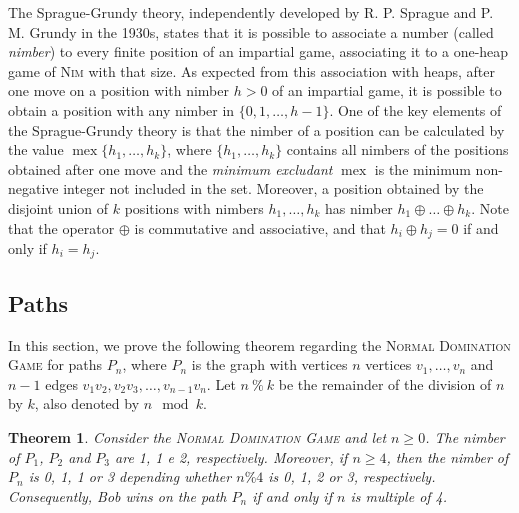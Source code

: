 \documentclass[12pt]{article}
\newtheorem{theorem}{Theorem}[section]
\DeclareMathOperator{\mex}{mex}
\newcommand{\xor}{\oplus}
\begin{document}
The Sprague-Grundy theory, independently developed by R. P. Sprague \cite{sprague36} and P. M. Grundy \cite{grundy39} in the 1930s, states that it is possible to associate a number (called \emph{nimber}) to every finite position of an impartial game, associating it to a one-heap game of \textsc{Nim} with that size. As expected from this association with heaps, after one move on a position with nimber $h>0$ of an impartial game, it is possible to obtain a position with any nimber in $\{0,1,\ldots,h-1\}$. %
One of the key elements of the Sprague-Grundy theory is that the nimber of a position can be calculated by the value $\mex\{h_1,\ldots,h_k\}$, where $\{h_1,\ldots,h_k\}$ contains all nimbers of the positions obtained after one move and the \emph{minimum excludant} $\mex$ is the minimum non-negative integer not included in the set.
Moreover, a position obtained by the disjoint union of $k$ positions with nimbers $h_1,\ldots,h_k$ has nimber $h_1\xor\ldots\xor h_k$.
Note that the operator $\xor$ is commutative and associative, and that $h_i\xor h_j=0$ if and only if $h_i=h_j$.


\subsection{Paths}\label{sec:paths}

In this section, we prove the following theorem regarding the  \textsc{Normal Domination Game} for paths $P_n$, where $P_n$ is the graph with vertices $n$ vertices $v_1,\ldots,v_n$ and $n-1$ edges $v_1v_2, v_2v_3,\ldots,v_{n-1}v_n$.
Let $n\ \%\ k$ be the remainder of the division of $n$ by $k$, also denoted by $n\mod k$.

\begin{theorem}\label{teo-nimb}
Consider the \textsc{Normal Domination Game} and let $n\geq 0$.
The nimber of $P_1$, $P_2$ and $P_3$ are 1, 1 e 2, respectively. Moreover, if $n\geq 4$, then the nimber of $P_n$ is 0, 1, 1 or 3 depending whether $n\% 4$ is 0, 1, 2 or 3, respectively.
Consequently, Bob wins on the path $P_n$ if and only if $n$ is multiple of 4.
\end{theorem}
\end{document}
